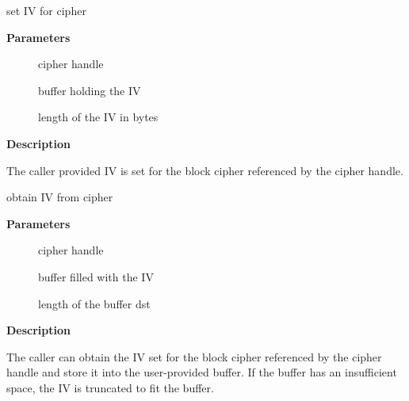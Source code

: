 \documentclass[a4paper,8pt,english]{sphinxmanual}
\begin{document}
\begin{fulllineitems}
\label{crypto/api-skcipher:c.crypto_blkcipher_set_iv}
set IV for cipher

\end{fulllineitems}


\textbf{Parameters}
\begin{description}
\item[{}] \leavevmode
cipher handle

\item[{}] \leavevmode
buffer holding the IV

\item[{}] \leavevmode
length of the IV in bytes

\end{description}

\textbf{Description}

The caller provided IV is set for the block cipher referenced by the cipher
handle.

\begin{fulllineitems}
\label{crypto/api-skcipher:c.crypto_blkcipher_get_iv}
obtain IV from cipher

\end{fulllineitems}


\textbf{Parameters}
\begin{description}
\item[{}] \leavevmode
cipher handle

\item[{}] \leavevmode
buffer filled with the IV

\item[{}] \leavevmode
length of the buffer dst

\end{description}

\textbf{Description}

The caller can obtain the IV set for the block cipher referenced by the
cipher handle and store it into the user-provided buffer. If the buffer
has an insufficient space, the IV is truncated to fit the buffer.
\end{document}
